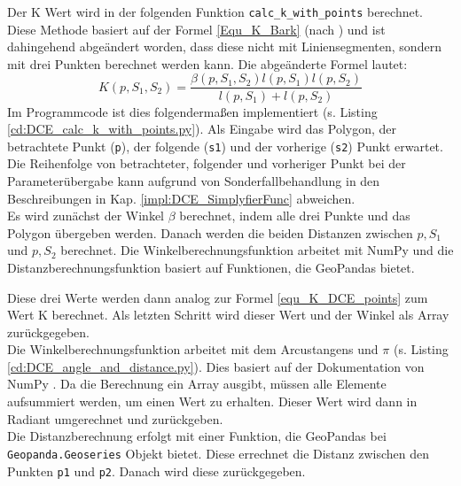 {	Der K Wert wird in der folgenden Funktion \lstinline|calc_k_with_points| berechnet. Diese Methode basiert auf der Formel \ref{Equ_K_Bark} (nach \citet{Latecki1999a}) und ist dahingehend abgeändert worden, dass diese nicht mit Liniensegmenten, sondern mit drei Punkten berechnet werden kann. Die abgeänderte Formel lautet:
	\begin{equation}
		K(p,S_1,S_2) = \frac{\beta(p, S_1, S_2)l(p, S_1)l(p, S_2)}{l(p, S_1) + l(p, S_2)} 
		\label{equ_K_DCE_points}
	\end{equation}
	Im Programmcode ist dies folgendermaßen implementiert (s. Listing \ref{cd:DCE_calc_k_with_points.py}). Als Eingabe wird das Polygon, der betrachtete Punkt (\lstinline|p|), der folgende (\lstinline|s1|) und der vorherige (\lstinline|s2|) Punkt erwartet. Die Reihenfolge von betrachteter, folgender und vorheriger Punkt bei der Parameterübergabe kann aufgrund von Sonderfallbehandlung in den Beschreibungen in Kap. \ref{impl:DCE_SimplyfierFunc} abweichen. \\ 
	Es wird zunächst der Winkel $\beta$ berechnet, indem alle drei Punkte und das Polygon übergeben werden. Danach werden die beiden Distanzen zwischen $p, S_1$ und $p, S_2$ berechnet. Die Winkelberechnungsfunktion arbeitet mit NumPy und die Distanzberechnungsfunktion basiert auf Funktionen, die GeoPandas bietet.
	
	Diese drei Werte werden dann analog zur Formel \ref{equ_K_DCE_points} zum Wert K berechnet. Als letzten Schritt wird dieser Wert und der Winkel als Array zurückgegeben. \\
	Die Winkelberechnungsfunktion arbeitet mit dem Arcustangens und $\pi$ \ifimportant (s. Listing \ref{cd:DCE_angle_and_distance.py})\fi. Dies basiert auf der Dokumentation von NumPy \citep{numpy_angle}. Da die Berechnung ein Array ausgibt, müssen alle Elemente aufsummiert werden, um einen Wert zu erhalten. Dieser Wert wird dann in Radiant umgerechnet und zurückgeben. \\
	Die Distanzberechnung erfolgt mit einer Funktion, die GeoPandas bei \lstinline|Geopanda.Geoseries| Objekt bietet. Diese errechnet die Distanz zwischen den Punkten \lstinline|p1| und \lstinline|p2|. Danach wird diese zurückgegeben.
	\ifimportant
	
	\fi

}

